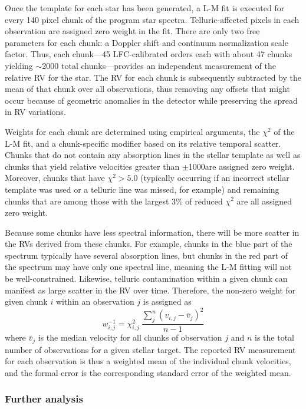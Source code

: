 Once the template for each star has been generated, a L-M fit is executed for every 140 pixel chunk of the program star spectra. Telluric-affected pixels in each observation are assigned zero weight in the fit. There are only two free parameters for each chunk: a Doppler shift and continuum normalization scale factor. Thus, each chunk---45 LFC-calibrated orders each with about 47 chunks yielding $\sim$2000 total chunks---provides an independent measurement of the relative RV for the star. The RV for each chunk is subsequently subtracted by the mean of that chunk over all observations, thus removing any offsets that might occur because of geometric anomalies in the detector while preserving the spread in RV variations.

Weights for each chunk are determined using empirical arguments, the $\chi^2$ of the L-M fit, and a chunk-specific modifier based on its relative temporal scatter. Chunks that do not contain any absorption lines in the stellar template as well as chunks that yield relative velocities greater than $\pm$1000\ms are assigned zero weight. Moreover, chunks that have $\chi^2 > 5.0$ (typically occurring if an incorrect stellar template was used or a telluric line was missed, for example) and remaining chunks that are among those with the largest 3\% of reduced $\chi^2$ are all assigned zero weight.

Because some chunks have less spectral information, there will be more scatter in the RVs derived from these chunks. For example, chunks in the blue part of the spectrum typically have several absorption lines, but chunks in the red part of the spectrum may have only one spectral line, meaning the L-M fitting will not be well-constrained. Likewise, telluric contamination within a given chunk can manifest as large scatter in the RV over time. Therefore, the non-zero weight for given chunk $i$ within an observation $j$ is assigned as
\begin{equation}
    w_{i,j}^{-1} = \chi^2_{i,j}~\frac{\sum_{j}^{n} (v_{i,j} - \bar{v}_{j})^2}{n-1}
    \label{eq:chunk-weight}
\end{equation}
where $\bar{v}_{j}$ is the median velocity for all chunks of observation $j$ and $n$ is the total number of observations for a given stellar target. The reported RV measurement for each observation is thus a weighted mean of the individual chunk velocities, and the formal error is the corresponding standard error of the weighted mean.

\hypertarget{further-analysis}{%
\subsubsection{Further analysis}\label{further-analysis}}

